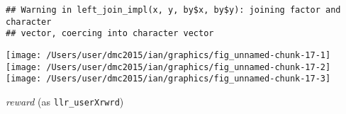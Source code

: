 \documentclass[10pt]{report}
\newenvironment{Shaded}{}{}
\newcommand{\KeywordTok}[1]{\textcolor[rgb]{0.00,0.44,0.13}{\textbf{{#1}}}}
\newcommand{\DataTypeTok}[1]{\textcolor[rgb]{0.56,0.13,0.00}{{#1}}}
\newcommand{\StringTok}[1]{\textcolor[rgb]{0.25,0.44,0.63}{{#1}}}
\newcommand{\NormalTok}[1]{{#1}}
\begin{document}
\begin{Shaded}
\end{Shaded}

\begin{verbatim}
## Warning in left_join_impl(x, y, by$x, by$y): joining factor and character
## vector, coercing into character vector
\end{verbatim}

\begin{Shaded}
\end{Shaded}

\begin{center}\texttt{[image: /Users/user/dmc2015/ian/graphics/fig\_unnamed-chunk-17-1]} \texttt{[image: /Users/user/dmc2015/ian/graphics/fig\_unnamed-chunk-17-2]} \texttt{[image: /Users/user/dmc2015/ian/graphics/fig\_unnamed-chunk-17-3]} \end{center}

\emph{reward} (as \texttt{llr\_userXrwrd})
\end{document}
